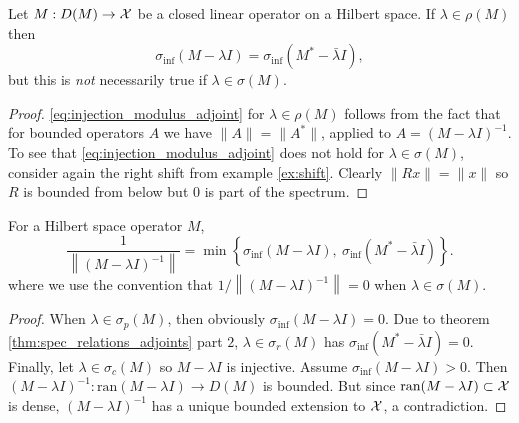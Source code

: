 \begin{lemma}
    \label{lem:injection_modulus}
    Let $M : D(M) \to \mathcal{X}$ be a closed linear operator on a Hilbert space. 
    If $\lambda \in \rho (M)$ then 
    \begin{equation}
        \label{eq:injection_modulus_adjoint}
        \sigma_{\inf} (M - \lambda I) = \sigma_{\inf} (M^* - \bar{\lambda} I) , 
    \end{equation}
    but this is \emph{not} necessarily true if $\lambda \in \sigma (M)$. 
\end{lemma}

\begin{proof}
    \ref{eq:injection_modulus_adjoint} for $\lambda \in \rho (M)$ follows from the fact 
    that for bounded operators $A$ we have $\| A \| = \| A^* \|$, applied to 
    $A = (M - \lambda I)^{-1}$. To see that \ref{eq:injection_modulus_adjoint} does not 
    hold for $\lambda \in \sigma (M)$, consider again the right shift from example 
    \ref{ex:shift}. Clearly $\| R x \| = \| x \|$ so $R$ is bounded from below but $0$ 
    is part of the spectrum. 
\end{proof}

\begin{theorem}
    \label{thm:resolvent_adjoint}
    For a Hilbert space operator $M$, 
    \begin{equation}
        \frac{1}{\left\| (M - \lambda I)^{-1} \right\|} = \min \left\{ 
            \sigma_{\inf} (M - \lambda I),\ \sigma_{\inf} (M^* - \bar{\lambda} I)
         \right\} . 
    \end{equation}
    where we use the convention that $1 / \left\| (M - \lambda I)^{-1} \right\| = 0$ 
    when $\lambda \in \sigma (M)$. 
\end{theorem}

\begin{proof}
    When $\lambda \in \sigma_p (M)$, then obviously $\sigma_{\inf} (M - \lambda I) = 0$. 
    Due to theorem \ref{thm:spec_relations_adjoints} part $2$, $\lambda \in \sigma_r (M)$ 
    has $\sigma_{\inf} (M^* - \bar{\lambda} I) = 0$. Finally, let 
    $\lambda \in \sigma_c (M)$ so $M - \lambda I$ is injective. Assume 
    $\sigma_{\inf} (M - \lambda I) > 0$. Then 
    $(M - \lambda I)^{-1} : \text{ran} (M - \lambda I) \to D(M)$ is bounded. 
    But since $\text{ran} (M - \lambda I) \subset \mathcal{X}$ is dense, $(M - \lambda I)^{-1}$ 
    has a unique bounded extension to $\mathcal{X}$, a contradiction. 
\end{proof}

